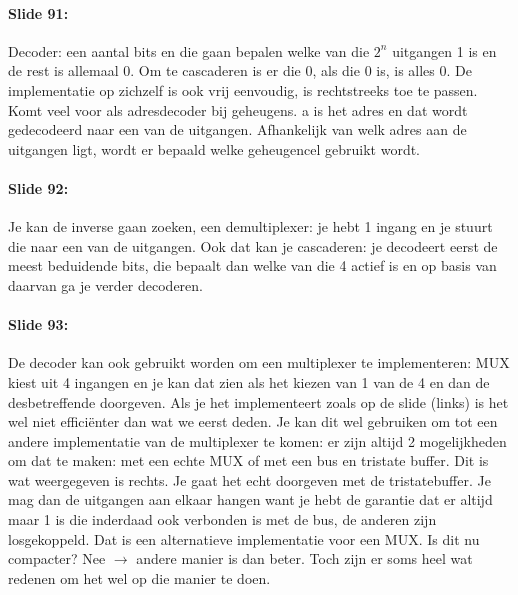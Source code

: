 \documentclass[10pt,a4paper]{book}
\begin{document}
\paragraph{Slide 91:} Decoder: een aantal bits en die gaan bepalen welke van die $2^n$ uitgangen 1 is en de rest is allemaal 0. Om te cascaderen is er die 0, als die 0 is, is alles 0. De implementatie op zichzelf is ook vrij eenvoudig, is rechtstreeks toe te passen. Komt veel voor als adresdecoder bij geheugens. a is het adres en dat wordt gedecodeerd naar een van de uitgangen. Afhankelijk van welk adres aan de uitgangen ligt, wordt er bepaald welke geheugencel gebruikt wordt.

\paragraph{Slide 92:} Je kan de inverse gaan zoeken, een demultiplexer: je hebt 1 ingang en je stuurt die naar een van de uitgangen. Ook dat kan je cascaderen: je decodeert eerst de meest beduidende bits, die bepaalt dan welke van die 4 actief is en op basis van daarvan ga je verder decoderen.

\paragraph{Slide 93:} De decoder kan ook gebruikt worden om een multiplexer te implementeren: MUX kiest uit 4 ingangen en je kan dat zien als het kiezen van 1 van de 4 en dan de desbetreffende doorgeven. Als je het implementeert zoals op de slide (links) is het wel niet effici\"enter dan wat we eerst deden. Je kan dit wel gebruiken om tot een andere implementatie van de multiplexer te komen: er zijn altijd 2 mogelijkheden om dat te maken: met een echte MUX of met een bus en tristate buffer. Dit is wat weergegeven is rechts. Je gaat het echt doorgeven met de tristatebuffer. Je mag dan de uitgangen aan elkaar hangen want je hebt de garantie dat er altijd maar 1 is die inderdaad ook verbonden is met de bus, de anderen zijn losgekoppeld. Dat is een alternatieve implementatie voor een MUX. Is dit nu compacter? Nee $\rightarrow$ andere manier is dan beter. Toch zijn er soms heel wat redenen om het wel op die manier te doen.
\end{document}
